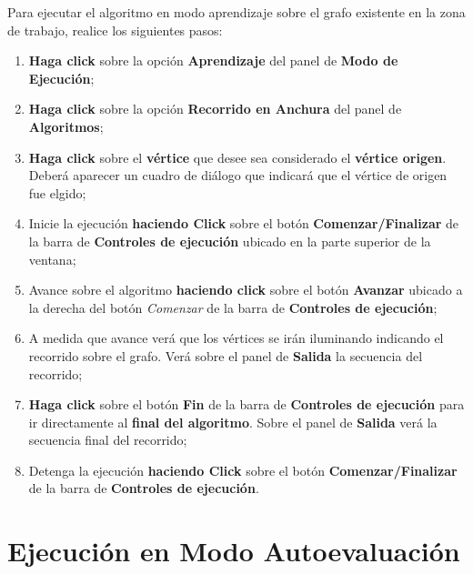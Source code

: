 \documentclass{book}
\begin{document}
Para ejecutar el algoritmo en modo aprendizaje sobre el grafo existente en la zona de trabajo, realice los siguientes pasos:
\medskip

\begin{enumerate}
	\itemsep=8pt \topsep=0pt \partopsep=0pt \parskip=0pt \parsep=0pt

	\item \textbf{Haga click} sobre la opción \textbf{Aprendizaje} del panel de \textbf{Modo de Ejecución};

	\item \textbf{Haga click} sobre la opción \textbf{Recorrido en Anchura} del panel de \textbf{Algoritmos};

	\item \textbf{Haga click} sobre el \textbf{vértice} que desee sea considerado el \textbf{vértice origen}. Deberá aparecer un cuadro de diálogo que indicará que el vértice de origen fue elgido;

	\item Inicie la ejecución \textbf{haciendo Click} sobre el botón \textbf{Comenzar/Finalizar} de la barra de \textbf{Controles de ejecución} ubicado en la parte superior de la ventana;

	\item Avance sobre el algoritmo \textbf{haciendo click} sobre el botón \textbf{Avanzar} ubicado a la derecha del botón \textit{Comenzar} de la barra de \textbf{Controles de ejecución};

	\item A medida que avance verá que los vértices se irán iluminando indicando el recorrido sobre el grafo. Verá sobre el panel de \textbf{Salida} la secuencia del recorrido;

	\item \textbf{Haga click} sobre el botón \textbf{Fin} de la barra de \textbf{Controles de ejecución} para ir directamente al \textbf{final del algoritmo}. Sobre el panel de \textbf{Salida} verá la secuencia final del recorrido;

	\item Detenga la ejecución \textbf{haciendo Click} sobre el botón \textbf{Comenzar/Finalizar} de la barra de \textbf{Controles de ejecución}.

\end{enumerate}
\medskip



\section{Ejecución en Modo Autoevaluación}
\end{document}
